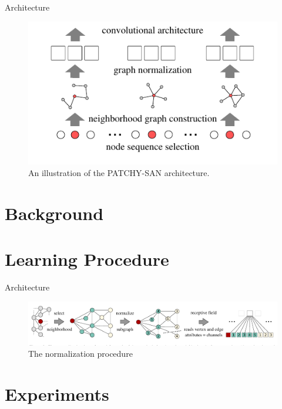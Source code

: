 \documentclass[dvipdfmx]{beamer}
\begin{document}
  \begin{frame}{Architecture}
    \begin{figure}[h]
      \centering
      \includegraphics[width=0.8\paperwidth]{img/Fig2.pdf}
      \caption{An illustration of the PATCHY-SAN architecture.}
    \end{figure}
  \end{frame}

\section{Background}

\section{Learning Procedure}

  \begin{frame}{Architecture}
    \begin{figure}[h]
      \centering
      \includegraphics[width=0.9\paperwidth]{img/Fig3.pdf}
      \caption{The normalization procedure}
    \end{figure}
  \end{frame}

\section{Experiments}
\end{document}
